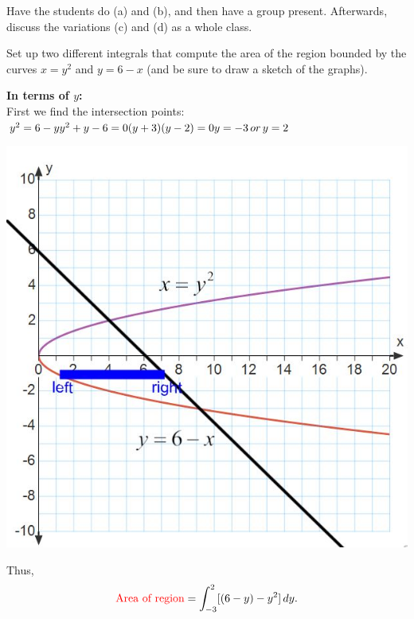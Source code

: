 \documentclass[noinstructornotes]{ximera}
\begin{document}
\begin{instructorNotes}
Have the students do (a) and (b), and then have a group present.  
Afterwards, discuss the variations (c) and (d) as a whole class.
\end{instructorNotes}





\newpage

\begin{problem}
Set up two different integrals that compute the area of the region bounded by the curves  $x=y^2$ and $y=6-x$ (and be sure to draw a sketch of the graphs).
	
				\begin{freeResponse} 
				\textbf{ In terms of $y$:}\\
				First we find the intersection points:\\
				$y^2=6-y\\
				y^2+y-6=0\\
				(y+3)(y-2)=0\\
				y=-3 \, or \, y=2$
			\begin{image}
			\includegraphics[scale=0.5]{Figure6-2-4new.jpg}
			\end{image}
		Thus,
		\[
		\text{{\color{red} Area of region}} =  \int_{-3}^2 [(6-y) - y^2] \,d y .
		\]
		

\end{freeResponse}
\end{problem}
\end{document}
